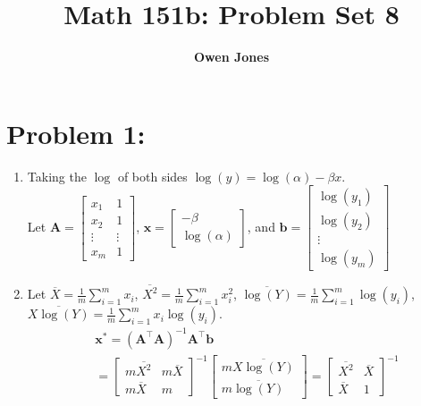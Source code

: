 \documentclass[10pt]{article}
\title{\bf Math 151b: Problem Set 8}
\author{\bf Owen Jones}
\begin{document}
\maketitle
\section*{Problem 1:}
\begin{enumerate}[label=(\alph*)]
    \item Taking the $\log$ of both sides $\log(y)=\log(\alpha)-\beta x$.\\
    Let $\mathbf{A}=\begin{bmatrix}
        x_1 & 1\\
        x_2 & 1\\
        \vdots & \vdots\\
        x_m & 1
    \end{bmatrix}$, $\mathbf{x}=\begin{bmatrix}
        -\beta\\
        \log(\alpha)
    \end{bmatrix}$, and $\mathbf{b}=\begin{bmatrix}
        \log(y_1)\\
        \log(y_2)\\
        \vdots\\
        \log(y_m)
    \end{bmatrix}$
    \item Let $\overline{X}=\frac{1}{m}\sum_{i=1}^{m}x_i$, $\overline{X^2}=\frac{1}{m}\sum_{i=1}^{m}x_i^2$, $\overline{\log(Y)}=\frac{1}{m}\sum_{i=1}^{m}\log(y_i)$, $\overline{X\log(Y)}=\frac{1}{m}\sum_{i=1}^{m}x_i\log(y_i)$.
    \begin{align*}
        &\mathbf{x}^*={(\mathbf{A}^\top\mathbf{A})}^{-1}\mathbf{A}^\top\mathbf{b}\\
        &=\begin{bmatrix}
            m\overline{X^2} & m\overline{X}\\
            m\overline{X} & m
        \end{bmatrix}^{-1}
        \begin{bmatrix}
            m\overline{X\log(Y)}\\
            m\overline{\log(Y)}
        \end{bmatrix}=\begin{bmatrix}
            \overline{X^2} & \overline{X}\\
            \overline{X} & 1
        \end{bmatrix}^{-1}

\end{align*}
\end{enumerate}
\end{document}
